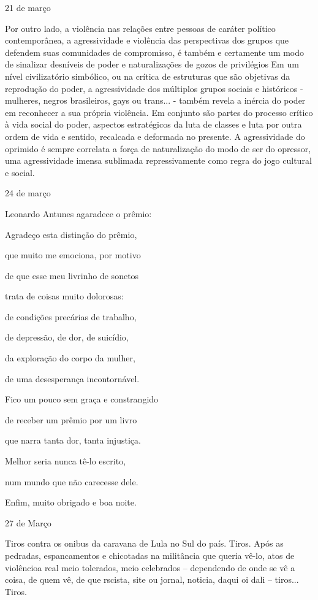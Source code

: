 21 de março

Por outro lado, a violência nas relações entre pessoas de caráter
político contemporânea, a agressividade e violência das perspectivas dos
grupos que defendem suas comunidades de compromisso, é também e
certamente um modo de sinalizar desníveis de poder e naturalizações de
gozos de privilégios Em um nível civilizatório simbólico, ou na crítica
de estruturas que são objetivas da reprodução do poder, a agressividade
dos múltiplos grupos sociais e históricos - mulheres, negros
brasileiros, gays ou trans... - também revela a inércia do poder em
reconhecer a sua própria violência. Em conjunto são partes do processo
crítico à vida social do poder, aspectos estratégicos da luta de classes
e luta por outra ordem de vida e sentido, recalcada e deformada no
presente. A agressividade do oprimido é sempre correlata a força de
naturalização do modo de ser do opressor, uma agressividade imensa
sublimada repressivamente como regra do jogo cultural e social.

24 de março

Leonardo Antunes agaradece o prêmio:

Agradeço esta distinção do prêmio,

que muito me emociona, por motivo

de que esse meu livrinho de sonetos

trata de coisas muito dolorosas:

de condições precárias de trabalho,

de depressão, de dor, de suicídio,

da exploração do corpo da mulher,

de uma desesperança incontornável.

Fico um pouco sem graça e constrangido

de receber um prêmio por um livro

que narra tanta dor, tanta injustiça.

Melhor seria nunca tê-lo escrito,

num mundo que não carecesse dele.

Enfim, muito obrigado e boa noite.

27 de Março

Tiros contra os onibus da caravana de Lula no Sul do país. Tiros. Após
as pedradas, espancamentos e chicotadas na militância que queria vê-lo,
atos de violêncioa real meio tolerados, meio celebrados -- dependendo de
onde se vê a coisa, de quem vê, de que rscista, site ou jornal, noticia,
daqui oi dali -- tiros... Tiros.

